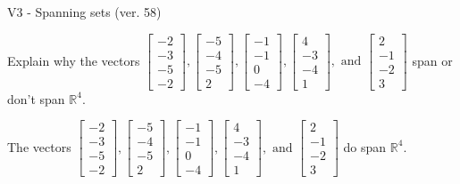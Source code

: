 \begin{exercise}
  \begin{exerciseTitle}V3 - Spanning sets (ver. 58)\end{exerciseTitle}
  \begin{exerciseStatement}
    Explain why the vectors \(\left[\begin{array}{r}
-2 \\
-3 \\
-5 \\
-2
\end{array}\right] , \left[\begin{array}{r}
-5 \\
-4 \\
-5 \\
2
\end{array}\right] , \left[\begin{array}{r}
-1 \\
-1 \\
0 \\
-4
\end{array}\right] , \left[\begin{array}{r}
4 \\
-3 \\
-4 \\
1
\end{array}\right] , \text{ and } \left[\begin{array}{r}
2 \\
-1 \\
-2 \\
3
\end{array}\right]\) span or don't span \(\mathbb{R}^4\). 
	


  \end{exerciseStatement}
  \begin{exerciseAnswer}
   The vectors \(\left[\begin{array}{r}
-2 \\
-3 \\
-5 \\
-2
\end{array}\right] , \left[\begin{array}{r}
-5 \\
-4 \\
-5 \\
2
\end{array}\right] , \left[\begin{array}{r}
-1 \\
-1 \\
0 \\
-4
\end{array}\right] , \left[\begin{array}{r}
4 \\
-3 \\
-4 \\
1
\end{array}\right] , \text{ and } \left[\begin{array}{r}
2 \\
-1 \\
-2 \\
3
\end{array}\right]\) 
  	 do  
	span \(\mathbb{R}^4\).
  



\end{exerciseAnswer}
\end{exercise}
